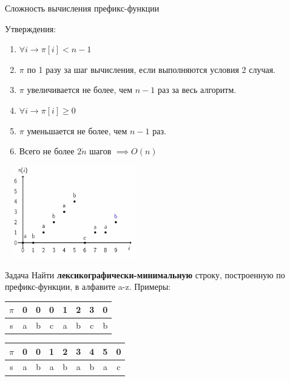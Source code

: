 \documentclass[10pt]{beamer}
\begin{document}
\begin{frame}[fragile]{Сложность вычисления префикс-функции}
\begin{multicols}{2}
Утверждения:
\begin{enumerate}
\item $\forall i \rightarrow \pi[i] < n-1$
\item $\pi$ по 1 разу за шаг вычисления, если выполняются условия 2 случая.
\item $\pi$ увеличивается не более, чем $n-1$ раз за весь алгоритм.
\item $\forall i \rightarrow \pi[i] \ge 0$
\item $\pi$ уменьшается не более, чем $n-1$ раз.
\item Всего не более $2\dot n$ шагов $\implies O(n)$
\end{enumerate}
\vfill\eject
\includegraphics[width=6cm, height=4cm]{Term_3/Source/Pictures/prefix_graph.png}
\end{multicols}
\end{frame}


\begin{frame}[fragile]{Задача}
Найти \textbf{лексикографически-минимальную} строку, построенную по префикс-функции, в алфавите a-z.
Примеры: 
\begin{center}
\begin{tabular}{ |c|ccccccc| } 
 \hline
 $\pi$ & 0 & 0 & 0 & 1 & 2 & 3 & 0 \\ 
   \hline
 s & a & b & c & a & b & c & b \\ 
 \hline
\end{tabular}
\end{center}
\begin{center}
\begin{tabular}{ |c|cccccccc| } 
 \hline
 $\pi$ & 0 & 0 & 1 & 2 & 3 & 4 & 5 & 0 \\ 
   \hline
     s & a & b & a & b & a & b & a & c \\ 
 \hline
\end{tabular}
\end{center}
\end{frame}
\end{document}

